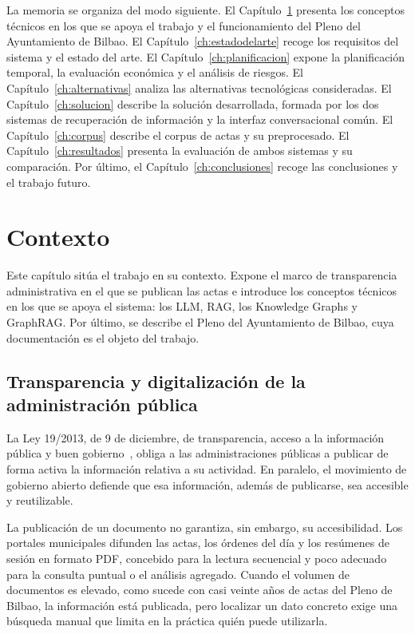\documentclass[11pt, a4paper]{report}
\begin{document}
	La memoria se organiza del modo siguiente. El Capítulo~\ref{ch:contexto}
	presenta los conceptos técnicos en los que se apoya el trabajo y el
	funcionamiento del Pleno del Ayuntamiento de Bilbao. El
	Capítulo~\ref{ch:estadodelarte} recoge los requisitos del sistema y el estado
	del arte. El Capítulo~\ref{ch:planificacion} expone la planificación temporal,
	la evaluación económica y el análisis de riesgos. El
	Capítulo~\ref{ch:alternativas} analiza las alternativas tecnológicas
	consideradas. El Capítulo~\ref{ch:solucion} describe la solución desarrollada,
	formada por los dos sistemas de recuperación de información y la interfaz
	conversacional común. El Capítulo~\ref{ch:corpus} describe el corpus de actas
	y su preprocesado. El Capítulo~\ref{ch:resultados} presenta la evaluación de
	ambos sistemas y su comparación. Por último, el Capítulo~\ref{ch:conclusiones}
	recoge las conclusiones y el trabajo futuro.

	\chapter{Contexto}
	\label{ch:contexto}

	Este capítulo sitúa el trabajo en su contexto. Expone el marco de
	transparencia administrativa en el que se publican las actas e introduce los
	conceptos técnicos en los que se apoya el
	sistema: los LLM, RAG, los Knowledge Graphs y GraphRAG. Por último, se describe
	el Pleno del Ayuntamiento de Bilbao, cuya documentación es el objeto del trabajo.

	\section{Transparencia y digitalización de la administración pública}

	La Ley 19/2013, de 9 de diciembre, de transparencia, acceso a la información
	pública y buen gobierno~\cite{ley-transparencia}, obliga a las
	administraciones públicas a publicar de forma activa la información relativa a
	su actividad. En paralelo, el movimiento de gobierno abierto defiende que esa
	información, además de publicarse, sea accesible y reutilizable.

	La publicación de un documento no garantiza, sin embargo, su accesibilidad.
	Los portales municipales difunden las actas, los órdenes del día y los
	resúmenes de sesión en formato PDF, concebido para la lectura secuencial y
	poco adecuado para la consulta puntual o el análisis agregado. Cuando el
	volumen de documentos es elevado, como sucede con casi veinte años de actas
	del Pleno de Bilbao, la información está publicada, pero localizar un dato concreto exige una búsqueda manual que limita en la práctica
	quién puede utilizarla.
\end{document}

